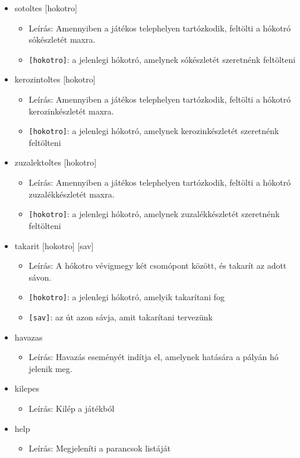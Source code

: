 \begin{itemize}
    \item sotoltes [hokotro]
    \begin{itemize}
        \item Leírás: Amennyiben a játékos telephelyen tartózkodik, feltölti a hókotró sókészletét maxra. 
        \item \texttt{[hokotro]}: a jelenlegi hókotró, amelynek sókészletét szeretnénk feltölteni
    \end{itemize}

    \item kerozintoltes [hokotro]
    \begin{itemize}
        \item Leírás: Amennyiben a játékos telephelyen tartózkodik, feltölti a hókotró kerozinkészletét maxra.
        \item \texttt{[hokotro]}: a jelenlegi hókotró, amelynek kerozinkészletét szeretnénk feltölteni
    \end{itemize}

    \item zuzalektoltes [hokotro]
    \begin{itemize}
        \item Leírás: Amennyiben a játékos telephelyen tartózkodik, feltölti a hókotró zuzalékkészletét maxra.
        \item \texttt{[hokotro]}: a jelenlegi hókotró, amelynek zuzalékkészletét szeretnénk feltölteni
    \end{itemize}

    \item takarit [hokotro] [sav]
    \begin{itemize}
        \item Leírás: A hókotro vévigmegy két csomópont között, és takarít az adott sávon. 
        \item \texttt{[hokotro]}: a jelenlegi hókotró, amelyik takarítani fog
        \item \texttt{[sav]}: az út azon sávja, amit takarítani tervezünk
    \end{itemize}

    \item havazas 
    \begin{itemize}
        \item Leírás: Havazás eseményét indítja el, amelynek hatására a pályán hó jelenik meg. 
    \end{itemize}

    \item kilepes
    \begin{itemize}
        \item Leírás: Kilép a játékból
    \end{itemize}

    \item help
    \begin{itemize}
        \item Leírás: Megjeleníti a parancsok listáját
    \end{itemize}


\end{itemize}
